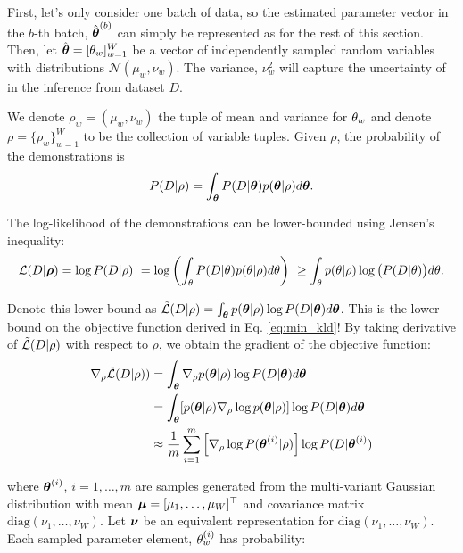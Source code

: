     First, let's only consider one batch of data, so the estimated parameter vector in the $b$-th batch,
    $\hat{\boldsymbol{\mathbb{\theta}}}^{(b)}$ can simply be represented as \estimate{\paramVec} for the rest of this section. Then,
    let $\hat{\boldsymbol{\mathbb{\theta}}} = [ \theta_{w}]_{w=1}^W$ be a vector of independently sampled random variables with
    distributions $\mathcal{N}(\mu_w, \nu_w)$. The variance, $\nu_w^2$ will capture the uncertainty of \paramElem in the
    inference from dataset $D$.

    We denote $\rho_w = (\mu_w, \nu_w)$ the tuple of mean and variance for $\theta_{w}$ and denote $\rho
    =\{\rho_w\}_{w=1}^W$ to be the collection of variable tuples.  Given $\rho$, the probability of the demonstrations
    is
    \[
    P(D |\rho) = \int_{\boldsymbol{\mathbb{\theta}} } P(D|\boldsymbol{\mathbb{\theta}}) p(\boldsymbol{\mathbb{\theta}} | \rho)d\boldsymbol{\mathbb{\theta}}.
    \]

    \noindent
     The log-likelihood of the demonstrations can be lower-bounded using Jensen's inequality:
    \begin{equation*}
    \mathcal{L}(D|\boldsymbol{\mathbb{\rho}} ) = \log P(D|\rho)\
         = \log \left( \int_{\theta}P(D|\theta) p(\theta | \rho)d\theta \right)\
         \ge \int_\theta p(\theta|\rho)\log \big( P(D|\theta) \big) d\theta.
    \end{equation*}


    Denote this lower bound as $\tilde{\mathcal{L}}(D|\rho)=\int_{\boldsymbol{\mathbb{\theta}}} p(\boldsymbol{\mathbb{\theta}} |\rho) \log P(D|\boldsymbol{\mathbb{\theta}})
    d\boldsymbol{\mathbb{\theta}}$. This is the lower bound on the objective function derived in Eq. \ref{eq:min_kld}!  By taking
    derivative of $\tilde{\mathcal{L}}(D|\rho)$ with respect to $\rho$, we obtain the gradient of the objective function:
    \begin{equation}\label{eq:logLike}
        \begin{aligned}
            \nabla_\rho \tilde{\mathcal{L}}(D|\rho)) & =
                \int_{\boldsymbol{\mathbb{\theta}}}\nabla_\rho p(\boldsymbol{\mathbb{\theta}}|\rho) \log P(D|\boldsymbol{\mathbb{\theta}})d\boldsymbol{\mathbb{\theta}}\\
            & = \int_{\boldsymbol{\mathbb{\theta}}}[ p(\boldsymbol{\mathbb{\theta}}|\rho) \nabla_\rho \log p(\boldsymbol{\mathbb{\theta}}|\rho) ] \log P(D|\boldsymbol{\mathbb{\theta}})d\boldsymbol{\mathbb{\theta}}\\
            &\approx \frac{1}{m} \sum_{ i=1}^m \left[\nabla_\rho \log P(\boldsymbol{\mathbb{\theta}}^{(i)}|\rho) \right] \log
                P(D|\boldsymbol{\mathbb{\theta}}^{(i)})
        \end{aligned}
    \end{equation}

    \noindent
    where $\boldsymbol{\mathbb{\theta}}^{(i)}$, $i=1,\ldots, m$ are samples generated from the multi-variant Gaussian distribution with
    mean  $\boldsymbol{\mathbb{\mu}} = [\mu_1,\ldots, \mu_W]^\top$ and covariance matrix $\mbox{diag}\left(\nu_1,\ldots, \nu_W\right)$.
    Let $\boldsymbol{\mathbb{\nu}}$ be an equivalent representation for $\mbox{diag}\left(\nu_1,\ldots, \nu_W\right)$. Each sampled
    parameter element, $\theta_{w}^{(i)}$ has probability:

